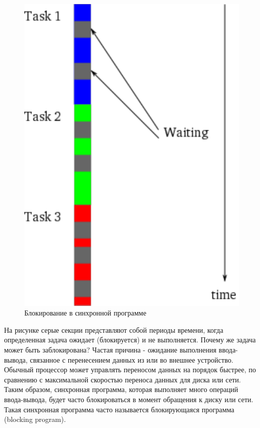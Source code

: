 \begin{figure}[h]
\begin{center}
    \includegraphics[height=0.3\textheight]{images/block.pdf}
\end{center}
    \caption{Блокирование в синхронной программе\label{fig:block}}
\end{figure}

На рисунке серые секции представляют собой периоды времени, 
когда определенная задача ожидает (блокируется) и не выполняется. 
Почему же задача может быть заблокирована? Частая причина - ожидание 
выполнения  ввода-вывода, связанное с перенесением 
данных из или во внешнее устройство. Обычный процессор может 
управлять переносом данных на порядок быстрее, по сравнению с максимальной 
скоростью переноса данных для диска или сети. Таким образом, синхронная 
программа, которая выполняет много операций ввода-вывода, будет 
часто блокироваться в момент обращения к диску или сети. Такая синхронная 
программа часто называется блокирующаяся программа (blocking program).


